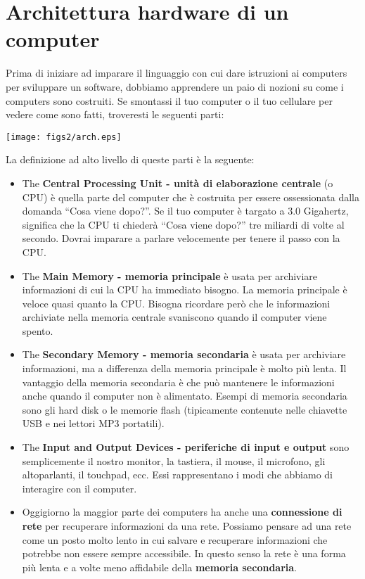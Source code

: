 \section{Architettura hardware di un computer}

Prima di iniziare ad imparare il linguaggio con cui dare istruzioni ai computers per sviluppare un software, dobbiamo apprendere un paio di nozioni su come i computers sono costruiti. Se smontassi il tuo computer o il tuo cellulare per vedere come sono fatti, troveresti le seguenti parti:

\beforefig
\centerline{\texttt{[image: figs2/arch.eps]}}
\afterfig

La definizione ad alto livello di queste parti \`{e} la seguente:

\begin{itemize}

\item The {\bf Central Processing Unit - unit\`{a} di elaborazione centrale} (o CPU) \`{e} quella parte del computer che \`{e} costruita per essere ossessionata dalla domanda {``}Cosa viene dopo?''. Se il tuo computer \`{e} targato a 3.0 Gigahertz, significa che la CPU ti chieder\`{a} {``}Cosa viene dopo?'' tre miliardi di volte al secondo. Dovrai imparare a parlare velocemente per tenere il passo con la CPU.

\item The {\bf Main Memory - memoria principale} \`{e} usata per archiviare informazioni di cui la CPU ha immediato bisogno. La memoria principale \`{e} veloce quasi quanto la CPU. Bisogna ricordare per\`{o} che le informazioni archiviate nella memoria centrale svaniscono quando il computer viene spento.


\item The {\bf Secondary Memory - memoria secondaria} \`{e} usata per archiviare informazioni, ma a differenza della memoria principale \`{e} molto pi\`{u} lenta. Il vantaggio della memoria secondaria \`{e} che pu\`{o} mantenere le informazioni anche quando il computer non \`{e} alimentato. Esempi di memoria secondaria sono gli hard disk o le memorie flash (tipicamente contenute nelle chiavette USB e nei lettori MP3 portatili).

\item The {\bf Input and Output Devices - periferiche di input e output} sono semplicemente il nostro monitor, la tastiera, il mouse, il microfono, gli altoparlanti, il touchpad, ecc. Essi rappresentano i modi che abbiamo di interagire con il computer.

\item 	Oggigiorno la maggior parte dei computers ha anche una
{\bf connessione di rete} per recuperare informazioni da una rete. Possiamo pensare ad una rete come un posto molto lento in cui salvare e recuperare informazioni che potrebbe non essere sempre accessibile. In questo senso la rete \`{e} una forma pi\`{u} lenta e a volte meno affidabile della 
{\bf memoria secondaria}.

\end{itemize}

